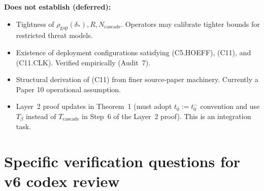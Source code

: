 \documentclass{article}
\newcommand{\deltastar}{\delta_{*}}
\newcommand{\rhogap}{\rho_{\mathrm{gap}}}
\newcommand{\Tbeta}{T_{\beta}}
\newcommand{\Ncasc}{N_{\mathrm{cascade}}}
\begin{document}
\textbf{Does not establish (deferred):}
\begin{itemize}
\item Tightness of $\rhogap(\deltastar), R, \Ncasc$.  Operators
  may calibrate tighter bounds for restricted threat models.
\item Existence of deployment configurations satisfying (C5.HOEFF),
  (C11), and (C11.CLK).  Verified empirically (Audit~7).
\item Structural derivation of (C11) from finer source-paper
  machinery.  Currently a Paper 10 operational assumption.
\item Layer~2 proof updates in Theorem~1 (must adopt $t_0 := t_0^-$
  convention and use $\Tbeta$ instead of $T_{\mathrm{cascade}}$ in
  Step~6 of the Layer~2 proof).  This is an integration task.
\end{itemize}

\section{Specific verification questions for v6 codex review}
\end{document}
